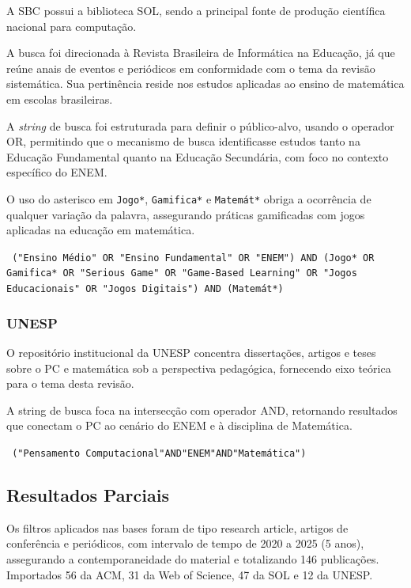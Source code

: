 \documentclass[12pt]{article}
\begin{document}
A SBC possui a biblioteca SOL, sendo a principal fonte de produção científica nacional para computação.

A busca foi direcionada à Revista Brasileira de Informática na Educação, já que reúne anais de eventos e periódicos em conformidade com o tema da revisão sistemática. Sua pertinência reside nos estudos aplicadas ao ensino de matemática em escolas brasileiras.

A \textit{string} de busca foi estruturada para definir o público-alvo, usando o operador OR, permitindo que o mecanismo de busca identificasse estudos tanto na Educação Fundamental quanto na Educação Secundária, com foco no contexto específico do ENEM.

O uso do asterisco em \texttt{Jogo*}, \texttt{Gamifica*} e \texttt{Matemát*} obriga a ocorrência de qualquer variação da palavra, assegurando práticas gamificadas com jogos aplicadas na educação em matemática.

\begin{center}
\texttt{
("Ensino Médio" OR "Ensino Fundamental" OR "ENEM") AND (Jogo* OR Gamifica* OR "Serious Game" OR "Game-Based Learning" OR "Jogos Educacionais" OR "Jogos Digitais") AND (Matemát*)}
\end{center}

\subsubsection{UNESP}

O repositório institucional da UNESP concentra dissertações, artigos e teses sobre o PC e matemática sob a perspectiva pedagógica, fornecendo eixo teórica para o tema desta revisão.

A string de busca foca na intersecção com operador AND, retornando resultados que conectam o PC ao cenário do ENEM e à disciplina de Matemática.

\begin{center}
\texttt{
("Pensamento Computacional"AND"ENEM"AND"Matemática")}
\end{center}

\subsection{Resultados Parciais}
Os filtros aplicados nas bases foram de tipo research article, artigos de conferência e periódicos, com intervalo de tempo de 2020 a 2025 (5 anos), assegurando a contemporaneidade do material e totalizando 146 publicações. Importados 56 da ACM, 31 da Web of Science, 47 da SOL e 12 da UNESP.
\end{document}

